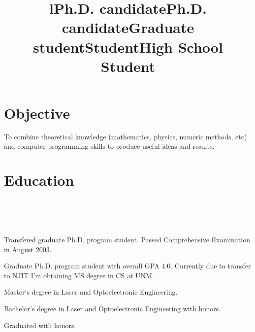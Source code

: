 \documentclass[10pt,overlapped,line]{res}
\begin{document}
\begin{resume}

\section{Objective}
To combine theoretical knowledge (mathematics, physics, numeric
methods, etc) and computer programming skills to produce useful ideas
and results.

\section{Education}
\begin{format}
  \title{l}\\
  \\
  \body\\
\end{format}

\title{Ph.D. candidate}
\begin{position}
  Transfered graduate Ph.D. program student. Passed Comprehensive Examination in August 2003.
\end{position}

 \title{Ph.D. candidate}
 \begin{position}
   Graduate Ph.D. program student with overall GPA 4.0. Currently due
   to transfer to NJIT I'm obtaining MS degree in CS at UNM.
 \end{position}

 \title{Graduate student}
 \begin{position}
  Master`s degree in Laser and Optoelectronic Engineering.
 \end{position}

 \title{Student}
 \begin{position}
  Bachelor's degree in Laser and Optoelectronic Engineering with
  honors.
 \end{position}

 \title{High School Student}
 \begin{position}
  Graduated with honors.
 \end{position}


\end{resume}
\end{document}
